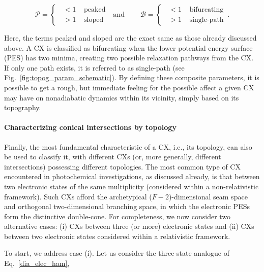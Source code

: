 \documentclass[9pt,bestpractices,pubversion]{livecoms}
\begin{document}
\begin{equation}
    \mathcal{P} = \begin{cases}
    \;\; < 1 \;\;\;\; \text{peaked} \\
    \;\; > 1 \;\;\;\; \text{sloped}
    \end{cases} 
    \:\:\: \text{and} \:\:\:\:\:\:\:\:\:\:
    \mathcal{B} = \begin{cases}
    \;\; < 1 \;\;\;\; \text{bifurcating} \\
    \;\; > 1 \;\;\;\; \text{single-path}
    \end{cases} \, .
\end{equation}

Here, the terms peaked and sloped are the exact same as those already discussed above.\cite{atchity_potential_1991}
A CX is classified as bifurcating when the lower potential energy surface (PES) has two minima, creating two possible relaxation pathways from the CX. If only one path exists, it is referred to as single-path (see Fig.~\ref{fig:topog_param_schematic}).
By defining these composite parameters, it is possible to get a rough, but immediate feeling for the possible affect a given CX may have on nonadiabatic dynamics within its vicinity, simply based on its topography.


\paragraph{Characterizing conical intersections by topology}
\label{ch2_topol}

Finally, the most fundamental characteristic of a CX, i.e., its topology, can also be used to classify it, with different CXs (or, more generally, different intersections) possessing different topologies.
The most common type of CX encountered in photochemical investigations, as discussed already, is that between two electronic states of the same multiplicity (considered within a non-relativistic framework).
Such CXs afford the archetypical ($F - 2$)-dimensional seam space and orthogonal two-dimensional branching space, in which the electronic PESs form the distinctive double-cone.
For completeness, we now consider two alternative cases: (i) CXs between three (or more) electronic states and (ii) CXs between two electronic states considered within a relativistic framework.

To start, we address case (i). 
Let us consider the three-state analogue of Eq.~\eqref{dia_elec_ham},\cite{matsika_nonadiabatic_2011}
\end{document}

